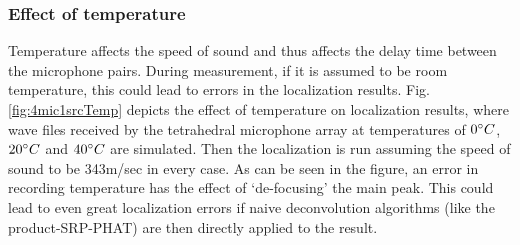 \subsubsection{Effect of temperature}
Temperature affects the speed of sound and thus affects the delay time between the microphone pairs. During measurement, if it is assumed to be room temperature, this could lead to errors in the localization results. Fig.\ref{fig:4mic1srcTemp} depicts the effect of temperature on localization results, where wave files received by the tetrahedral microphone array at temperatures of $0\degree C$, $20\degree C$ and $40\degree C$ are simulated. Then the localization is run assuming the speed of sound to be 343m/sec in every case. As can be seen in the figure, an error in recording temperature has the effect of `de-focusing' the main peak. This could lead to even great localization errors if naive deconvolution algorithms (like the product-SRP-PHAT) are then directly applied to the result. 

